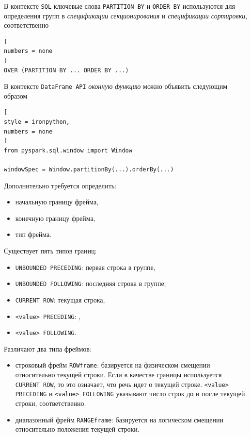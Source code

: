 \documentclass[%
	11pt,
	a4paper,
	utf8,
		]{article}
\begin{document}
В контексте \texttt{SQL} ключевые слова \texttt{PARTITION BY} и \texttt{ORDER BY} используются для определения групп в \emph{спецификации секционирования} и \emph{спецификации сортировки}, соответственно

\begin{lstlisting}[
numbers = none
]
OVER (PARTITION BY ... ORDER BY ...)
\end{lstlisting}

В контексте \texttt{DataFrame API} \emph{оконную функцию} можно объявить следующим образом

\begin{lstlisting}[
style = ironpython,
numbers = none
]
from pyspark.sql.window import Window

windowSpec = Window.partitionBy(...).orderBy(...)
\end{lstlisting}

Дополнительно требуется определить:

\begin{itemize}
	\item начальную границу фрейма,
	
	\item конечную границу фрейма,
	
	\item тип фрейма.
\end{itemize}

Существует пять типов границ:

\begin{itemize}
	\item \texttt{UNBOUNDED PRECEDING}: первая строка в группе,
	
	\item \texttt{UNBOUNDED FOLLOWING}: последняя строка в группе,
	
	\item \texttt{CURRENT ROW}: текущая строка,
	
	\item \texttt{<value> PRECEDING}: ,
	
	\item \texttt{<value> FOLLOWING}.
\end{itemize}

Различают два типа фреймов:

\begin{itemize}
	\item строковый фрейм \texttt{ROWframe}: базируется на физическом смещении относительно текущей строки. Если в качестве границы используется \texttt{CURRENT ROW}, то это означает, что речь идет о текущей строке. \texttt{<value> PRECEDING} и \texttt{<value> FOLLOWING} указывают число строк до и после текущей строки, соответственно.
	
	\item диапазонный фрейм \texttt{RANGEframe}: базируется на логическом смещении относительно положения текущей строки.
\end{itemize}
\end{document}
